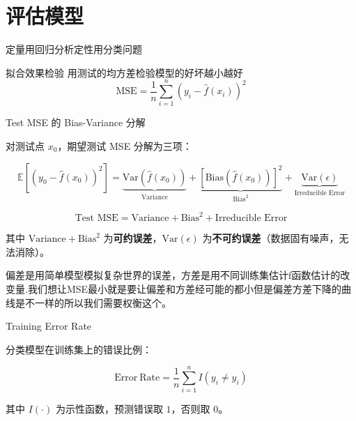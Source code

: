 \section{评估模型}
\begin{dxtips}
    定量用回归分析定性用分类问题
\end{dxtips}
\begin{note}{拟合效果检验}
用测试的均方差检验模型的好坏越小越好
  \[
\mathrm{MSE}
=
\frac{1}{n}
\sum_{i=1}^{n}
\left(y_i-\hat{f}(x_i)\right)^2
\]  
\end{note}
\begin{note}{Test MSE 的 Bias-Variance 分解}

对测试点 $x_0$，期望测试 MSE 分解为三项：

\[
\mathbb{E}[(y_0 - \hat{f}(x_0))^2] = 
\underbrace{\mathrm{Var}(\hat{f}(x_0))}_{\text{Variance}} + 
\underbrace{[\mathrm{Bias}(\hat{f}(x_0))]^2}_{\text{Bias}^2} + 
\underbrace{\mathrm{Var}(\epsilon)}_{\text{Irreducible Error}}
\]

\[
\boxed{\text{Test MSE} = \text{Variance} + \text{Bias}^2 + \text{Irreducible Error}}
\]

其中 $\text{Variance} + \text{Bias}^2$ 为\textbf{可约误差}，$\mathrm{Var}(\epsilon)$ 为\textbf{不可约误差}（数据固有噪声，无法消除）。

\end{note}
\begin{dxtips}
    偏差是用简单模型模拟复杂世界的误差，方差是用不同训练集估计f函数估计的改变量.我们想让MSE最小就是要让偏差和方差经可能的都小但是偏差方差下降的曲线是不一样的所以我们需要权衡这个。
\end{dxtips}
\begin{definition}{Training Error Rate}

分类模型在训练集上的错误比例：

\[
\mathrm{Error\ Rate} = \frac{1}{n}\sum_{i=1}^{n} I(y_i \neq \hat{y}_i)
\]

其中 $I(\cdot)$ 为示性函数，预测错误取 $1$，否则取 $0$。

\end{definition}
